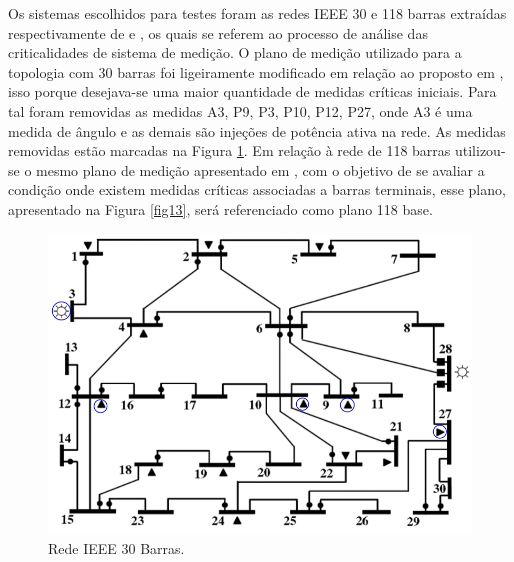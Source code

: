 \documentclass[12pt]{article}
\begin{document}
Os sistemas escolhidos para testes foram as redes IEEE 30 e 118 barras extraídas respectivamente de \cite{BB16} e \cite{Quant13}, os quais se referem ao processo de análise das criticalidades de sistema de medição. O plano de medição utilizado para a topologia com 30 barras foi ligeiramente modificado em relação ao proposto em \cite{BB16}, isso porque desejava-se uma maior quantidade de medidas críticas iniciais. Para tal foram removidas as medidas A3, P9, P3, P10, P12, P27, onde A3 é uma medida de ângulo e as demais são injeções de potência ativa na rede. As medidas removidas estão marcadas na Figura \ref{fig12}. Em relação à rede de 118 barras utilizou-se o mesmo plano de medição apresentado em \cite{Quant13}, com o objetivo de se avaliar a condição onde existem medidas críticas associadas a barras terminais, esse plano, apresentado na Figura \ref{fig13}, será referenciado como plano 118 base.


\begin{figure}[H]
	\centering 
	\includegraphics[scale=0.7]{figuras/Rede30bus.jpg}
	\caption{Rede IEEE 30 Barras.\cite{BB16}}
	\label{fig12} %
\end{figure}
\end{document}
